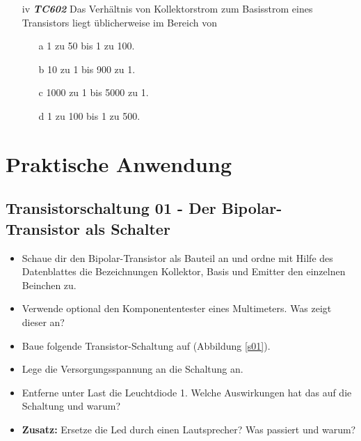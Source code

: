 
\begin{enumerate} 
\item[iv] \emph{\textbf{TC602}}  Das Verhältnis von Kollektorstrom zum Basisstrom eines Transistors liegt üblicherweise im Bereich von
	\begin{enumerate}
	\itemsep1pt\parskip0pt
		\item[a] 1 zu 50 bis 1 zu 100.
		\item[b] 10 zu 1 bis 900 zu 1.
		\item[c] 1000 zu 1 bis 5000 zu 1.
		\item[d] 1 zu 100 bis 1 zu 500.
	\end{enumerate}
\end{enumerate}


\section{Praktische Anwendung}

\subsection[Der Bipolar-Transistor als Schalter]{Transistorschaltung 01 - Der Bipolar-Transistor als Schalter}

\begin{itemize}
\itemsep1pt\parskip0pt
\item Schaue dir den Bipolar-Transistor als Bauteil an und ordne mit Hilfe des
      Datenblattes die Bezeichnungen Kollektor, Basis und Emitter den einzelnen
      Beinchen zu.
\item Verwende optional den Komponententester eines Multimeters. Was zeigt
      dieser an?
\item Baue folgende Transistor-Schaltung auf (Abbildung \ref{s01}). 
\item Lege die Versorgungsspannung an die Schaltung an.
\item Entferne unter Last die Leuchtdiode 1. Welche Auswirkungen hat das auf die Schaltung und warum?
\item \textbf{Zusatz:} Ersetze die Led durch einen Lautsprecher? Was passiert und warum?
\end{itemize}

